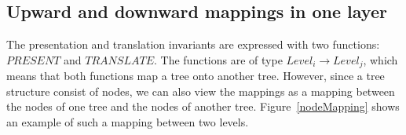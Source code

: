 






%								
\subsection{Upward and downward mappings in one layer} \label{mappingsInLayer}

The presentation and translation invariants are expressed with two functions: $PRESENT$ and $TRANSLATE$. The functions are of type $Level_i \rightarrow Level_j$, which means that both functions map a tree onto another tree. However, since a tree structure consist of nodes, we can also view the mappings as a mapping between the nodes of one tree and the nodes of another tree.  Figure~\ref{nodeMapping} shows an example of such a mapping between two levels. 


